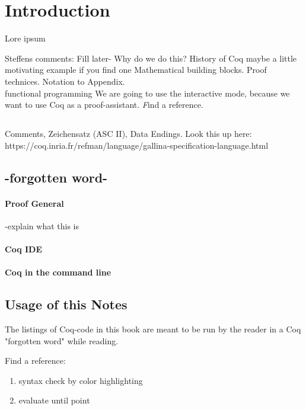 \section{Introduction}



Lore ipsum \cite{PACGGHSY}

Steffens comments:
Fill later-
 Why do we do this?
 History of Coq
 maybe a little motivating example if you find one
 Mathematical building blocks. Proof technices. Notation to Appendix.\\
 \gls{functional programming}
We are going to use the interactive mode, because we want to use Coq as a proof-assistant. {\emph Find a reference.}

\subsection{}

Comments, Zeichensatz (ASC II), Data Endings.
Look this up here:\\
https://coq.inria.fr/refman/language/gallina-specification-language.html
\subsection{-forgotten word-}



\paragraph{Proof General}
-explain what this is


\paragraph{Coq IDE}

\paragraph{Coq in the command line}




\subsection{Usage of this Notes}


The listings of Coq-code in this book are meant to be run by the reader in a Coq "forgotten word" while reading.

Find a reference:
\begin{enumerate}
\item syntax check by color highlighting
\item evaluate until point
\end{enumerate}




